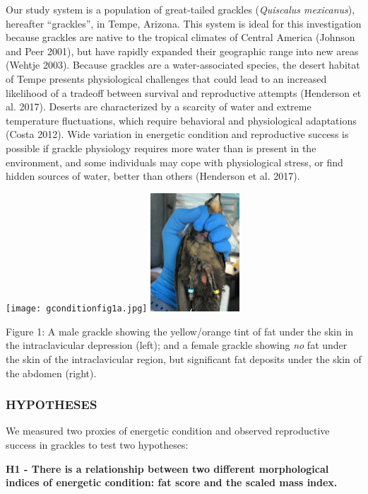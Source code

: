 \documentclass[
]{article}
\begin{document}
Our study system is a population of great-tailed grackles
(\emph{Quiscalus mexicanus}), hereafter ``grackles'', in Tempe, Arizona.
This system is ideal for this investigation because grackles are native
to the tropical climates of Central America (Johnson and Peer 2001), but
have rapidly expanded their geographic range into new areas (Wehtje
2003). Because grackles are a water-associated species, the desert
habitat of Tempe presents physiological challenges that could lead to an
increased likelihood of a tradeoff between survival and reproductive
attempts (Henderson et al. 2017). Deserts are characterized by a
scarcity of water and extreme temperature fluctuations, which require
behavioral and physiological adaptations (Costa 2012). Wide variation in
energetic condition and reproductive success is possible if grackle
physiology requires more water than is present in the environment, and
some individuals may cope with physiological stress, or find hidden
sources of water, better than others (Henderson et al. 2017).

\texttt{[image: gconditionfig1a.jpg]}
\includegraphics[width=0.25\textwidth,height=\textheight]{gconditionfig1b.jpg}

Figure 1: A male grackle showing the yellow/orange tint of fat under the
skin in the intraclavicular depression (left); and a female grackle
showing \emph{no} fat under the skin of the intraclavicular region, but
significant fat deposits under the skin of the abdomen (right).

\hypertarget{hypotheses}{%
\subsubsection{HYPOTHESES}\label{hypotheses}}

We measured two proxies of energetic condition and observed reproductive
success in grackles to test two hypotheses:

\textbf{H1 - There is a relationship between two different morphological
indices of energetic condition: fat score and the scaled mass index.}
\end{document}
